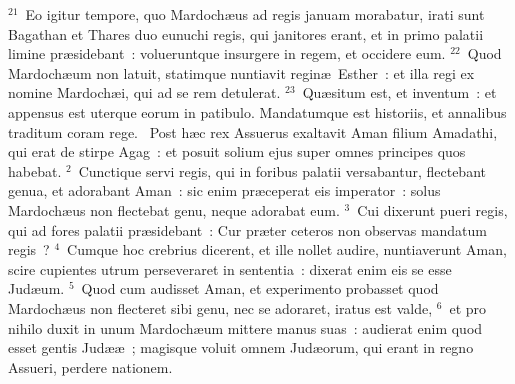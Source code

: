 ${}^{21}$~Eo igitur tempore, quo Mardoch\ae us ad regis januam morabatur, irati sunt Bagathan et Thares duo eunuchi regis, qui janitores erant, et in primo palatii limine pr\ae sidebant~: volueruntque insurgere in regem, et occidere eum.
${}^{22}$~Quod Mardoch\ae um non latuit, statimque nuntiavit regin\ae\ Esther~: et illa regi ex nomine Mardoch\ae i, qui ad se rem detulerat.
${}^{23}$~Qu\ae situm est, et inventum~: et appensus est uterque eorum in patibulo. Mandatumque est historiis, et annalibus traditum coram rege.
~\lettrine[lines=10,image=true,loversize=0.05,lraise=-0.03]{P}{}ost h\ae c rex Assuerus exaltavit Aman filium Amadathi, qui erat de stirpe Agag~: et posuit solium ejus super omnes principes quos habebat.
${}^{2}$~Cunctique servi regis, qui in foribus palatii versabantur, flectebant genua, et adorabant Aman~: sic enim pr\ae ceperat eis imperator~: solus Mardoch\ae us non flectebat genu, neque adorabat eum.
${}^{3}$~Cui dixerunt pueri regis, qui ad fores palatii pr\ae sidebant~: Cur pr\ae ter ceteros non observas mandatum regis~?
${}^{4}$~Cumque hoc crebrius dicerent, et ille nollet audire, nuntiaverunt Aman, scire cupientes utrum perseveraret in sententia~: dixerat enim eis se esse Jud\ae um.
${}^{5}$~Quod cum audisset Aman, et experimento probasset quod Mardoch\ae us non flecteret sibi genu, nec se adoraret, iratus est valde,
${}^{6}$~et pro nihilo duxit in unum Mardoch\ae um mittere manus suas~: audierat enim quod esset gentis Jud\ae \ae~; magisque voluit omnem Jud\ae orum, qui erant in regno Assueri, perdere nationem.


